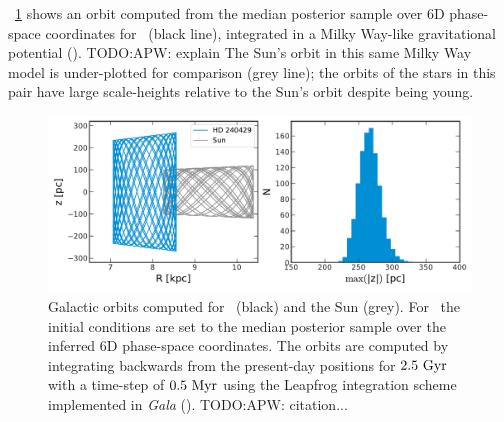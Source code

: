 \documentclass[manuscript]{aastex6}
\newcommand{\project}[1]{\textsl{#1}}
\newcommand*\elem[1]{\ensuremath{\mathrm{#1}}}
\newcommand{\sunanalog}{\text{Krios}}
\newcommand{\todo}[1]{{\color{blue}TODO:#1}}
\begin{document}
\figurename~\ref{fig:orbit} shows an orbit computed from the median posterior
sample over 6D phase-space coordinates for \sunanalog\ (black line), integrated
in a Milky Way-like gravitational potential (\cite{Gala:2017}). \todo{APW:
explain}
The Sun's orbit in this same Milky Way model is under-plotted for comparison
(grey line); the orbits of the stars in this pair have large scale-heights
relative to the Sun's orbit despite being young.

\begin{figure}[htbp]
  \begin{center}
    \includegraphics[width=\linewidth]{orbits.pdf}
  \end{center}
  \caption{%
    Galactic orbits computed for \sunanalog\ (black) and the Sun (grey).
    For \sunanalog\, the initial conditions are set to the median posterior
    sample over the inferred 6D phase-space coordinates.
    The orbits are computed by integrating backwards from the present-day
    positions for $2.5~{\rm Gyr}$ with a time-step of $0.5~{\rm Myr}$ using the
    Leapfrog integration scheme implemented in \project{Gala}
    (\citealt{Gala:2017}). \todo{APW: citation...}
\label{fig:orbit}}
\end{figure}

\end{document}

